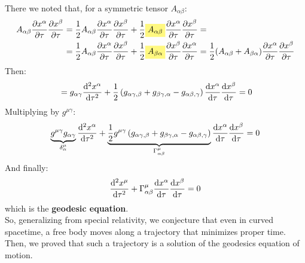 \documentclass[../template.tex]{subfiles}
\begin{document}
There we noted that, for a symmetric tensor $A_{\alpha \beta}$: 
\begin{align*}
    A_{\alpha \beta} \pdv{x^\alpha}{\tau}\pdv{x^\beta}{\tau} &= \frac{1}{2} A_{\alpha \beta} \pdv{x^\alpha}{\tau} \pdv{x^\beta}{\tau} + \frac{1}{2} \hlc{Yellow}{A_{\alpha \beta}}  \pdv{x^\alpha}{\tau}  \pdv{x^\beta}{\tau} =\\
    &= \frac{1}{2} A_{\alpha \beta}\pdv{x^\alpha}{\tau} \pdv{x^\beta}{\tau} + \frac{1}{2} \hlc{Yellow}{A_{\beta \alpha}} \pdv{x^\beta}{\tau} \pdv{x^\alpha}{\tau} = \frac{1}{2} (A_{\alpha \beta} + A_{\beta \alpha}) \pdv{x^\alpha}{\tau} \pdv{x^\beta}{\tau}   
\end{align*}
Then:
\begin{align*}
    &= g_{\alpha \gamma} \dv[2]{x^\alpha}{\tau} + \frac{1}{2}\left(g_{\alpha \gamma, \beta} + g_{\beta \gamma, \alpha} - g_{\alpha \beta, \gamma}\right)\dv{x^\alpha}{\tau} \dv{x^\beta}{\tau} = 0\\
\end{align*}
Multiplying by $g^{\mu \gamma}$:
\begin{align*}
    \underbrace{g^{\mu \gamma} g_{\alpha \gamma}}_{\delta^\mu_\alpha} \dv[2]{x^\alpha}{\tau} + \underbrace{\frac{1}{2} g^{\mu \gamma} \left(g_{\alpha \gamma, \beta} + g_{\beta \gamma, \alpha} - g_{\alpha \beta, \gamma}\right)}_{\Gamma^\mu_{\alpha \beta}}\dv{x^\alpha}{\tau}\dv{x^\beta}{\tau} = 0 
\end{align*} 
And finally:
\begin{align*}
    \dv[2]{x^\mu}{\tau} + \Gamma^{\mu}_{\alpha \beta }\dv{x^\alpha}{\tau} \dv{x^\beta}{\tau} = 0
\end{align*}
which is the \textbf{geodesic equation}.\\

So, generalizing from special relativity, we conjecture that even in curved spacetime, a free body moves along a trajectory that minimizes proper time. Then, we proved that such a trajectory is a solution of the geodesics equation of motion.
\end{document}
